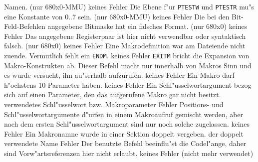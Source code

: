 \documentclass[12pt,a4paper,twoside]{report}
\newcommand{\tty}[1]{{\tt #1}}
\begin{document}
{\begin{description}
{                Namen. (nur 680x0-MMU)}
               {keines}
               {Fehler}
               {Die Ebene f"ur \tty{PTESTW} und \tty{PTESTR} mu"s eine
                Konstante von 0..7 sein. (nur 680x0-MMU)}
               {keines}
               {Fehler}
               {Die bei den Bit-Feld-Befehlen angegebene
                Bitmaske hat ein falsches Format. (nur 680x0)}
               {keines}
               {Fehler}
               {Das angegebene Registerpaar ist hier nicht
                verwendbar oder syntaktisch falsch. (nur 680x0)}
               {keines}
               {Fehler}
               {Eine Makrodefinition war am Dateiende nicht
                zuende.  Vermutlich fehlt ein \tty{ENDM}.}
               {keines}
               {Fehler}
               {\tty{EXITM} bricht die Expansion von 
                Makro-Konstrukten ab.  Dieser Befehl macht nur innerhalb 
                von Makros Sinn und es wurde versucht, ihn au"serhalb 
                aufzurufen.}
               {keines}
               {Fehler}
               {Ein Makro darf h"ochstens 10 Parameter haben.}
               {keines}
               {Fehler}
               {Ein Schl"usselwortargument bezog sich auf einen
                Parameter, den das aufgerufene Makro gar nicht
                besitzt.}
               {verwendetes Schl"usselwort bzw. Makroparameter}
               {Fehler}
               {Positions- und Schl"usselwortargumente d"urfen in
                einem Makroaufruf gemischt werden, aber nach dem
                ersten Schl"usselwortargument sind nur noch
                solche zugelassen.}
               {keines}
               {Fehler}
               {Ein Makronamne wurde in einer Sektion doppelt
                vergeben.}
               {der doppelt verwendete Name}
               {Fehler}
               {Der benutzte Befehl beeinflu"st die Codel"ange,
                daher sind Vorw"artsreferenzen hier nicht erlaubt.}
               {keines}
               {Fehler}
               {(nicht mehr verwendet)}

\end{description}}
\end{document}
